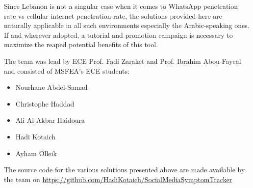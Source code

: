 \documentclass[12pt, a4paper]{article}
\begin{document}
Since Lebanon is not a singular case when it comes to WhatsApp
penetration rate vs cellular internet penetration rate, the solutions
provided here are naturally applicable in all such environments
especially the Arabic-speaking ones.  If and wherever adopted, a
tutorial and promotion campaign is necessary to maximize the reaped
potential benefits of this tool.


The team was lead by ECE Prof. Fadi Zaraket and Prof. Ibrahim Abou-Faycal 
and consisted of MSFEA's ECE students:
\begin{itemize}
\item Nourhane Abdel-Samad
\item Christophe Haddad 
\item Ali Al-Akbar Haidoura 
\item Hadi Kotaich
\item Ayham Olleik
\end{itemize}

The source code for the various solutions presented above are made
available by the team on \url{https://github.com/HadiKotaich/SocialMediaSymptomTracker}







\end{document}
